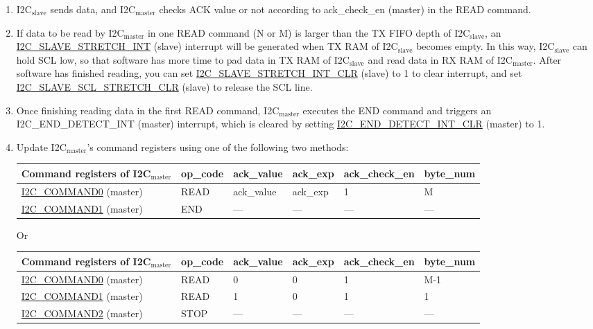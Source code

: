 \documentclass[main\_\_EN.tex]{subfiles}
\begin{document}
\begin{enumerate}
\item I2C$_\text{slave}$ sends data, and I2C$_\text{master}$ checks ACK value or not according to ack\_check\_en (master) in the READ command.
\item If data to be read by I2C$_\text{master}$ in one READ command (N or M) is larger than the TX FIFO depth of I2C$_\text{slave}$, an \hyperref[int:i2c-slave-stretch]{I2C\_SLAVE\_STRETCH\_INT} (slave) interrupt will be generated when TX RAM of I2C$_\text{slave}$ becomes empty. In this way, I2C$_\text{slave}$ can hold SCL low, so that software has more time to pad data in TX RAM of I2C$_\text{slave}$ and read data in RX RAM of I2C$_\text{master}$. After software has finished reading, you can set \hyperref[fielddesc:I2CSLAVESTRETCHINTCLR]{I2C\_SLAVE\_STRETCH\_INT\_CLR} (slave) to 1 to clear interrupt, and set \hyperref[fielddesc:I2CSLAVESCLSTRETCHCLR]{I2C\_SLAVE\_SCL\_STRETCH\_CLR} (slave) to release the SCL line.
\item Once finishing reading data in the first READ command, I2C$_\text{master}$ executes the END command and triggers an I2C\_END\_DETECT\_INT (master) interrupt, which is cleared by setting \hyperref[fielddesc:I2CENDDETECTINTCLR]{I2C\_END\_DETECT\_INT\_CLR} (master) to 1.
\item Update I2C$_\text{master}$'s command registers using one of the following two methods:
\begin{longtable}{ | p{4cm} | p{2cm} | p{2cm} | p{2cm} |p{2cm} | p{2cm} |}
\hline\rowcolor{lightgray}
Command registers of I2C$_\text{master}$& op\_code & ack\_value&ack\_exp&ack\_check\_en&byte\_num  \\ \hline
\hyperref[fielddesc:I2CCOMMAND0]{I2C\_COMMAND0} (master)& READ& ack\_value&ack\_exp&1&M  \\ \hline
\hyperref[fielddesc:I2CCOMMAND1]{I2C\_COMMAND1} (master)& END& ---&---&---&---  \\ \hline
\end{longtable} 

Or

\begin{longtable}{ | p{4cm} | p{2cm} | p{2cm} | p{2cm} |p{2cm} | p{2cm} |}
\hline\rowcolor{lightgray}
Command registers of I2C$_\text{master}$& op\_code & ack\_value&ack\_exp&ack\_check\_en&byte\_num  \\ \hline
\hyperref[fielddesc:I2CCOMMAND0]{I2C\_COMMAND0} (master)& READ& 0&0&1&M-1  \\ \hline
\hyperref[fielddesc:I2CCOMMAND1]{I2C\_COMMAND1} (master)& READ& 1&0&1&1  \\ \hline
\hyperref[fielddesc:I2CCOMMAND2]{I2C\_COMMAND2} (master)& STOP& ---&---&---&---  \\ \hline
\end{longtable} 





\end{enumerate}
\end{document}
